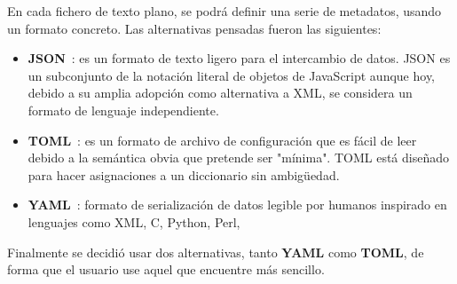 En cada fichero de texto plano, se podrá definir una serie de metadatos, usando un formato concreto. Las alternativas pensadas fueron
las siguientes:

\begin{itemize}
\item \textbf{JSON}~\cite{json}: es un formato de texto ligero para el intercambio de datos. JSON es un subconjunto de la notación literal de
objetos de JavaScript aunque hoy, debido a su amplia adopción como alternativa a XML, se considera un formato de lenguaje independiente.
\item \textbf{TOML}~\cite{toml}: es un formato de archivo de configuración que es fácil de leer debido a la semántica obvia que pretende ser
"mínima". TOML está diseñado para hacer asignaciones a un diccionario sin ambigüedad.
\item \textbf{YAML}~\cite{yaml}: formato de serialización de datos legible por humanos inspirado en lenguajes como XML, C, Python, Perl,
\end{itemize}


Finalmente se decidió usar dos alternativas, tanto \textbf{YAML} como \textbf{TOML}, de forma que el usuario use aquel que encuentre más
sencillo.
